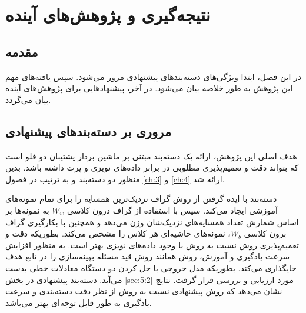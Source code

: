 
\chapter{نتیجه‌گیری و پژوهش‌های آینده}\label{ch:6}

\section{مقدمه}\label{sec:6:1}
در این فصل، ابتدا ویژگی‌های دسته‌بندهای پیشنهادی مرور می‌شود. سپس یافته‌های مهم این پژوهش به طور خلاصه بیان می‌شود. در آخر، پیشنهاد‌هایی برای پژوهش‌های آینده بیان می‌گردد.

\section{مروری بر دسته‌بندهای پیشنهادی}\label{sec:6:2}
هدف اصلی این پژوهش، ارائه یک دسته‌بند مبتنی بر ماشین بردار پشتیبان دو قلو است که بتواند دقت و تعمیم‌پذیری مطلوبی در برابر داده‌های نویزی و پرت داشته باشد. بدین منظور دو دسته‌بند  و  به ترتیب در فصول \ref{ch:3} و \ref{ch:4} ارائه شد.

دسته‌بند  \cite{mir2018} با ایده گرفتن از روش  گراف نزدیک‌ترین همسایه را برای تمام نمونه‌های آموزشی ایجاد می‌کند. سپس با استفاده از گراف درون کلاسی $W_{w}$ به نمونه‌ها بر اساس شمارش تعداد همسایه‌های نزدیک‌شان وزن می‌دهد و همچنین با بکارگیری گراف برون کلاسی $W_{b}$، نمونه‌های حاشیه‌ای هر کلاس را مشخص می‌کند. بطوریکه دقت و تعمیم‌پذیری روش  نسبت به روش  با وجود داده‌های نویزی بهتر است. به منظور افزایش سرعت یادگیری و آموزش، روش  همانند روش  قید مسئله بهینه‌سازی را در تابع هدف جایگذاری می‌کند. بطوریکه مدل خروجی با حل کردن دو دستگاه معادلات خطی بدست می‌آید. دسته‌بند پیشنهادی در بخش \ref{sec:5:2} مورد ارزیابی و بررسی قرار گرفت. نتایج نشان می‌دهد که روش پیشنهادی نسبت به روش  از نظر دقت دسته‌بندی و سرعت یادگیری به طور قابل توجه‌ای بهتر می‌باشد.

